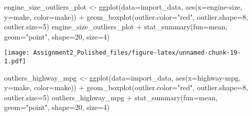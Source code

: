 \documentclass[
]{article}
\newenvironment{Shaded}{\begin{snugshade}}{\end{snugshade}}
\newcommand{\AttributeTok}[1]{\textcolor[rgb]{0.77,0.63,0.00}{#1}}
\newcommand{\DecValTok}[1]{\textcolor[rgb]{0.00,0.00,0.81}{#1}}
\newcommand{\FunctionTok}[1]{\textcolor[rgb]{0.00,0.00,0.00}{#1}}
\newcommand{\NormalTok}[1]{#1}
\newcommand{\OtherTok}[1]{\textcolor[rgb]{0.56,0.35,0.01}{#1}}
\newcommand{\SpecialCharTok}[1]{\textcolor[rgb]{0.00,0.00,0.00}{#1}}
\newcommand{\StringTok}[1]{\textcolor[rgb]{0.31,0.60,0.02}{#1}}
\begin{document}
\begin{Shaded}
\begin{Highlighting}[]
\NormalTok{engine\_size\_outliers\_plot }\OtherTok{\textless{}{-}} \FunctionTok{ggplot}\NormalTok{(}\AttributeTok{data=}\NormalTok{import\_data, }\FunctionTok{aes}\NormalTok{(}\AttributeTok{x=}\StringTok{\textasciigrave{}}\AttributeTok{engine{-}size}\StringTok{\textasciigrave{}}\NormalTok{, }\AttributeTok{y=}\StringTok{\textasciigrave{}}\AttributeTok{make}\StringTok{\textasciigrave{}}\NormalTok{, }\AttributeTok{color=}\StringTok{\textasciigrave{}}\AttributeTok{make}\StringTok{\textasciigrave{}}\NormalTok{)) }\SpecialCharTok{+} \FunctionTok{geom\_boxplot}\NormalTok{(}\AttributeTok{outlier.color=}\StringTok{"red"}\NormalTok{, }\AttributeTok{outlier.shape=}\DecValTok{8}\NormalTok{, }\AttributeTok{outlier.size=}\DecValTok{5}\NormalTok{)}
\NormalTok{engine\_size\_outliers\_plot }\SpecialCharTok{+} \FunctionTok{stat\_summary}\NormalTok{(}\AttributeTok{fun=}\NormalTok{mean, }\AttributeTok{geom=}\StringTok{"point"}\NormalTok{, }\AttributeTok{shape=}\DecValTok{20}\NormalTok{, }\AttributeTok{size=}\DecValTok{4}\NormalTok{)}
\end{Highlighting}
\end{Shaded}

\texttt{[image: Assignment2\_Polished\_files/figure-latex/unnamed-chunk-19-1.pdf]}

\begin{Shaded}
\begin{Highlighting}[]
\NormalTok{outliers\_highway\_mpg }\OtherTok{\textless{}{-}} \FunctionTok{ggplot}\NormalTok{(}\AttributeTok{data=}\NormalTok{import\_data, }\FunctionTok{aes}\NormalTok{(}\AttributeTok{x=}\StringTok{\textasciigrave{}}\AttributeTok{highway{-}mpg}\StringTok{\textasciigrave{}}\NormalTok{, }\AttributeTok{y=}\StringTok{\textasciigrave{}}\AttributeTok{make}\StringTok{\textasciigrave{}}\NormalTok{, }\AttributeTok{color=}\StringTok{\textasciigrave{}}\AttributeTok{make}\StringTok{\textasciigrave{}}\NormalTok{)) }\SpecialCharTok{+} \FunctionTok{geom\_boxplot}\NormalTok{(}\AttributeTok{outlier.color=}\StringTok{"red"}\NormalTok{, }\AttributeTok{outlier.shape=}\DecValTok{8}\NormalTok{, }\AttributeTok{outlier.size=}\DecValTok{5}\NormalTok{)}
\NormalTok{outliers\_highway\_mpg }\SpecialCharTok{+} \FunctionTok{stat\_summary}\NormalTok{(}\AttributeTok{fun=}\NormalTok{mean, }\AttributeTok{geom=}\StringTok{"point"}\NormalTok{, }\AttributeTok{shape=}\DecValTok{20}\NormalTok{, }\AttributeTok{size=}\DecValTok{4}\NormalTok{)}
\end{Highlighting}
\end{Shaded}
\end{document}
